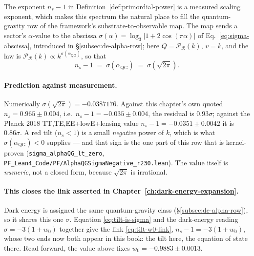 \begin{remark}
\label{rem:qg-tilt-row}
The exponent $n_s - 1$ in Definition~\ref{def:primordial-power} is a measured
scaling exponent, which makes this spectrum the natural place to fill the
quantum-gravity row of the framework's substrate-to-observable map. The map
sends a sector's $\alpha$-value to the abscissa
$\sigma(\alpha) = \log_3|1 + 2\cos(\pi\alpha)|$ of
Eq.~\eqref{eq:sigma-abscissa}, introduced in
\S\ref{subsec:de-alpha-row}; here $Q = \mathcal{P}_\mathcal{R}(k)$, $v = k$, and
the law is $\mathcal{P}_\mathcal{R}(k) \propto k^{\sigma(\alpha_{\text{QG}})}$,
so that
\begin{equation}
n_s - 1 \;=\; \sigma(\alpha_{\text{QG}}) \;=\; \sigma(\sqrt{2\pi}).
\label{eq:tilt-is-sigma}
\end{equation}

\paragraph{Prediction against measurement.}
Numerically $\sigma(\sqrt{2\pi}) = -0.0387176$. Against this chapter's own
quoted $n_s = 0.965 \pm 0.004$, i.e.\ $n_s - 1 = -0.035 \pm 0.004$, the
residual is $0.93\sigma$; against the Planck 2018 TT,TE,EE+lowE+lensing value
$n_s - 1 = -0.0351 \pm 0.0042$ it is $0.86\sigma$. A red tilt ($n_s < 1$) is a
small \emph{negative} power of $k$, which is what $\sigma(\alpha_{\text{QG}}) <
0$ supplies --- and that sign is the one part of this row that is kernel-proven
(\texttt{sigma\_alphaQG\_lt\_zero},
\texttt{PF\_Lean4\_Code/PF/AlphaQGSigmaNegative\_r230.lean}). The value itself is
\emph{numeric}, not a closed form, because $\sqrt{2\pi}$ is irrational.

\paragraph{This closes the link asserted in Chapter~\ref{ch:dark-energy-expansion}.}
Dark energy is assigned the same quantum-gravity class
(\S\ref{subsec:de-alpha-row}), so it shares this one $\sigma$. Equation
\eqref{eq:tilt-is-sigma} and the dark-energy reading
$\sigma = -3(1 + w_0)$ together give the link
\eqref{eq:tilt-w0-link}, $n_s - 1 = -3(1+w_0)$, whose two ends now both appear
in this book: the tilt here, the equation of state there. Read forward, the
value above fixes $w_0 = -0.9883 \pm 0.0013$.


\end{remark}
